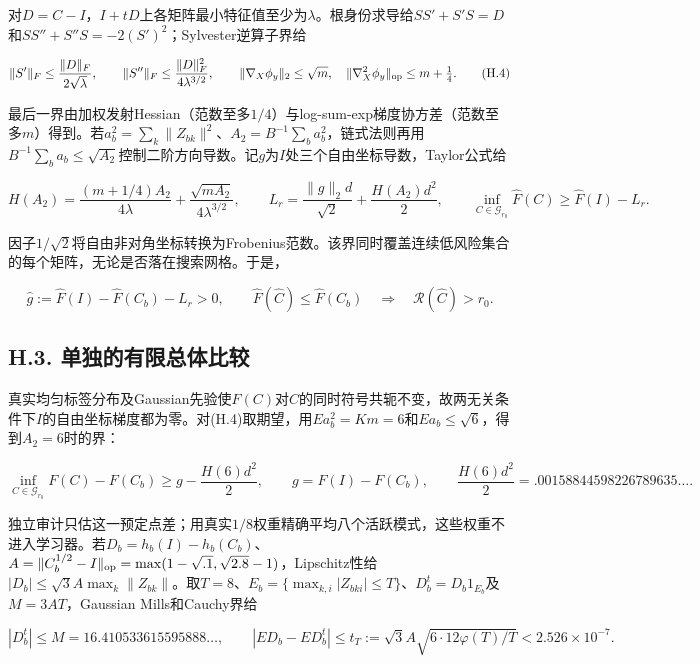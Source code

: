 \documentclass[11pt,a4paper]{article}
\begin{document}
对\(D=C-I\)，\(I+tD\)上各矩阵最小特征值至少为\(\lambda\)。根身份求导给\(SS'+S'S=D\)和\(SS''+S''S=-2(S')^2\)；Sylvester逆算子界给

\[
\|S'\|_F\le\frac{\|D\|_F}{2\sqrt\lambda},\qquad
\|S''\|_F\le\frac{\|D\|_F^2}{4\lambda^{3/2}},\qquad
\|\nabla_X\phi_y\|_2\le\sqrt m,\quad
\|\nabla_X^2\phi_y\|_{\rm op}\le m+\tfrac14.
\tag{H.4}
\]

最后一界由加权发射Hessian（范数至多\(1/4\)）与log-sum-exp梯度协方差（范数至多\(m\)）得到。若\(a_b^2=\sum_k\|Z_{bk}\|^2\)、\(A_2=B^{-1}\sum_ba_b^2\)，链式法则再用\(B^{-1}\sum_b a_b\le\sqrt{A_2}\)控制二阶方向导数。记\(g\)为\(I\)处三个自由坐标导数，Taylor公式给

\[
H(A_2)=\frac{(m+1/4)A_2}{4\lambda}
+\frac{\sqrt{mA_2}}{4\lambda^{3/2}},\qquad
L_r=\frac{\|g\|_2d}{\sqrt2}+\frac{H(A_2)d^2}{2},\qquad
\inf_{C\in\mathcal G_{r_0}}\widehat F(C)\ge\widehat F(I)-L_r.
\tag{H.5}
\]

因子\(1/\sqrt2\)将自由非对角坐标转换为Frobenius范数。该界同时覆盖连续低风险集合的每个矩阵，无论是否落在搜索网格。于是，

\[
\widehat g:=\widehat F(I)-\widehat F(C_b)-L_r>0,\qquad
\widehat F(\widehat C)\le\widehat F(C_b)
\quad\Longrightarrow\quad \mathcal R(\widehat C)>r_0.
\tag{H.6}
\]

\subsection*{H.3.
单独的有限总体比较}\label{h.3.-ux5355ux72ecux7684ux6709ux9650ux603bux4f53ux6bd4ux8f83}

真实均匀标签分布及Gaussian先验使\(F(C)\)对\(C\)的同时符号共轭不变，故两无关条件下\(I\)的自由坐标梯度都为零。对(H.4)取期望，用\(Ea_b^2=Km=6\)和\(Ea_b\le\sqrt6\)，得到\(A_2=6\)时的界：

\[
\inf_{C\in\mathcal G_{r_0}}F(C)-F(C_b)
\ge g-\frac{H(6)d^2}{2},\qquad
g=F(I)-F(C_b),\qquad \frac{H(6)d^2}{2}=.00158844598226789635\ldots.
\tag{H.7}
\]

独立审计只估这一预定点差；用真实\(1/8\)权重精确平均八个活跃模式，这些权重不进入学习器。若\(D_b=h_b(I)-h_b(C_b)\)、\(A=\|C_b^{1/2}-I\|_{\rm op}=\max(1-\sqrt{.1},\sqrt{2.8}-1)\)，Lipschitz性给\(|D_b|\le\sqrt3 A\max_k\|Z_{bk}\|\)。取\(T=8\)、\(E_b=\{\max_{k,i}|Z_{bki}|\le T\}\)、\(D_b^t=D_b1_{E_b}\)及\(M=3AT\)，Gaussian
Mills和Cauchy界给

\[
|D_b^t|\le M=16.410533615595888\ldots,\qquad
|ED_b-ED_b^t|\le t_T:=\sqrt3 A\sqrt{6\cdot12\varphi(T)/T}
<2.526\times10^{-7}.
\tag{H.8}
\]
\end{document}
